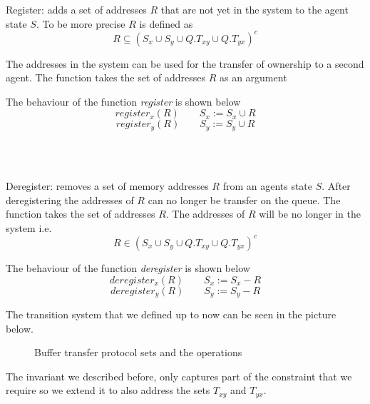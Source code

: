 \documentclass[a4paper,11pt,twoside]{report}
\begin{document}
	\begin{op} [Register]
		Register: adds a set of addresses $R$ that are not yet in the system to the agent state $S$. 
		To be more precise $R$ is defined as \[ R \subseteq (S_x \cup S_y \cup Q.T_{xy} \cup Q.T_{yx})^c \]
		
		The addresses in the system can be used for the transfer of ownership to a second agent. 
		The function takes the set of addresses $R$ as an argument
		
		The behaviour of the function \textit{register} is shown below 
		$$register_{x}(R) \quad \quad S_x := S_x \cup R $$
		$$register_{y}(R) \quad \quad S_y := S_y \cup R $$
	\end{op}
	\\
	\vspace{6mm}
	\\
	\begin{op} [Deregister]
		Deregister: removes a set of memory addresses $R$ from an agents
		state $S$. After deregistering the addresses of $R$ can no longer be transfer on
		the queue. The function takes the set of addresses $R$. The addresses
		of $R$ will be no longer in the system i.e. 
		\[R \in (S_x \cup S_y \cup Q.T_{xy} \cup Q.T_{yx})^c \]
		
		The behaviour of the function \textit{deregister} is shown below 
		$$deregister_{x}(R) \quad \quad S_x := S_x - R $$
		$$deregister_{y}(R) \quad \quad S_y := S_y - R $$
	\end{op}
	\clearpage
	The transition system that we defined up to now can be seen in the picture below. 
	
\begin{figure}[!h]
	\begin{center}
		\caption{Buffer transfer protocol sets and the operations}
		\centerline{}
		\end{center}
\end{figure}
		
	The invariant we described before, only captures part of the constraint that we require so we extend it to
	also address the sets $T_{xy}$ and $T_{yx}$.
	
\end{document}

